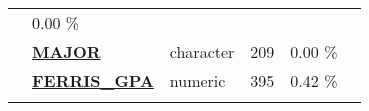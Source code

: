 \documentclass[]{article}
\begin{document}
\begin{longtable}[]{@{}lllrcl@{}}
\begin{minipage}[t]{0.11\columnwidth}
\end{minipage} & \begin{minipage}[t]{0.10\columnwidth}\centering\strut
0.00 \%\strut
\end{minipage} & \begin{minipage}[t]{0.13\columnwidth}\raggedright\strut
\strut
\end{minipage}\tabularnewline
\begin{minipage}[t]{0.08\columnwidth}\raggedright\strut
\strut
\end{minipage} & \begin{minipage}[t]{0.28\columnwidth}\raggedright\strut
\textbf{\protect\hyperlink{major}{MAJOR}}\strut
\end{minipage} & \begin{minipage}[t]{0.12\columnwidth}\raggedright\strut
character\strut
\end{minipage} & \begin{minipage}[t]{0.11\columnwidth}\raggedleft\strut
209\strut
\end{minipage} & \begin{minipage}[t]{0.10\columnwidth}\centering\strut
0.00 \%\strut
\end{minipage} & \begin{minipage}[t]{0.13\columnwidth}\raggedright\strut
\strut
\end{minipage}\tabularnewline
\begin{minipage}[t]{0.08\columnwidth}\raggedright\strut
\strut
\end{minipage} & \begin{minipage}[t]{0.28\columnwidth}\raggedright\strut
\textbf{\protect\hyperlink{ferris_gpa}{FERRIS\_GPA}}\strut
\end{minipage} & \begin{minipage}[t]{0.12\columnwidth}\raggedright\strut
numeric\strut
\end{minipage} & \begin{minipage}[t]{0.11\columnwidth}\raggedleft\strut
395\strut
\end{minipage} & \begin{minipage}[t]{0.10\columnwidth}\centering\strut
0.42 \%\strut
\end{minipage} & \begin{minipage}[t]{0.13\columnwidth}\raggedright\strut
\strut
\end{minipage}\tabularnewline
\begin{minipage}[t]{0.08\columnwidth}\raggedright\strut
\strut
\end{minipage} & \begin{minipage}[t]{0.28\columnwidth}\raggedright\strut

\end{minipage}
\end{longtable}
\end{document}
